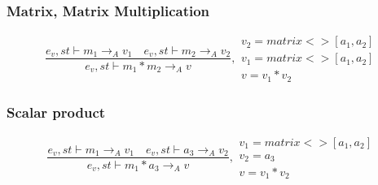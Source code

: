 \subsubsection{Matrix, Matrix Multiplication}
\begin{equation}
	\frac { { e }_{ v },st\vdash { m }_{ 1 }{ \rightarrow  }_{ A }{ v }_{ 1 }\quad { e }_{ v },st\vdash { m }_{ 2 }{ \rightarrow  }_{ A }{ v }_{ 2 } }{ { e }_{ v },st\vdash { m }_{ 1 }\ast { m }_{ 2 }{ \rightarrow  }_{ A }{ v } } ,\begin{matrix} { v }_{ 2 }=matrix<>[{ a }_{ 1 },{ a }_{ 2 }] \\ { v }_{ 1 }=matrix<>[{ a }_{ 1 },{ a }_{ 2 }] \\ v={ v }_{ 1 }*{ v }_{ 2 } \end{matrix}
\end{equation}

\subsubsection{Scalar product}
\begin{equation}
	\frac { { e }_{ v },st\vdash { m }_{ 1 }{ \rightarrow  }_{ A }{ v }_{ 1 }\quad { e }_{ v },st\vdash { a }_{ 3 }{ \rightarrow  }_{ A }{ v }_{ 2 } }{ { e }_{ v },st\vdash { m }_{ 1 }\ast { a }_{ 3 }{ \rightarrow  }_{ A }{ v } } ,\begin{matrix} { v }_{ 1 }=matrix<>[{ a }_{ 1 },{ a }_{ 2 }] \\ { v }_{ 2 }={ a }_{ 3 } \\ v={ v }_{ 1 }*{ v }_{ 2 } \end{matrix}
\end{equation}

